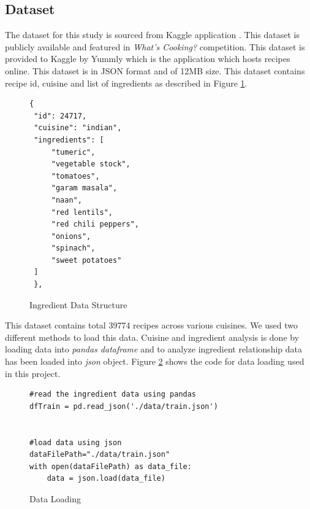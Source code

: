 \documentclass[sigconf]{acmart}
\begin{document}
\subsection{Dataset}
The dataset for this study is sourced from Kaggle application \cite{www-kaggle}. This dataset is publicly available and featured in \emph{What's Cooking?} competition. This dataset is provided to Kaggle by Yummly which is the application which hosts recipes online. This dataset is in JSON format and of 12MB size. This dataset contains recipe id, cuisine and list of ingredients as described in Figure \ref{c:data-structure}.
\begin{figure}[htb]
\begin{verbatim}
{
 "id": 24717,
 "cuisine": "indian",
 "ingredients": [
     "tumeric",
     "vegetable stock",
     "tomatoes",
     "garam masala",
     "naan",
     "red lentils",
     "red chili peppers",
     "onions",
     "spinach",
     "sweet potatoes"
 ]
 },
\end{verbatim}
\caption{Ingredient Data Structure}\label{c:data-structure}
\end{figure}
This dataset contains total 39774 recipes across various cuisines. We used two different methods to load this data. Cuisine and ingredient analysis is done by loading data into \emph{pandas dataframe} and to analyze ingredient relationship data has been loaded into \emph{json} object. Figure \ref{c:data-loading} shows the code for data loading used in this project.
\begin{figure}[htb]
\begin{verbatim}
#read the ingredient data using pandas
dfTrain = pd.read_json('./data/train.json')


#load data using json
dataFilePath="./data/train.json"
with open(dataFilePath) as data_file:    
    data = json.load(data_file)
\end{verbatim}
\caption{Data Loading}\label{c:data-loading}
\end{figure}
\end{document}

